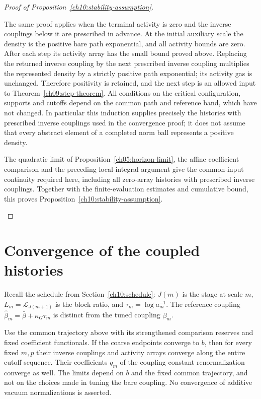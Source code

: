 \begin{proof}[Proof of Proposition~\ref{ch10:stability-assumption}]
\begin{enumerate}[label=\emph{Step \arabic*.},ref=\arabic*,leftmargin=*,align=left]
The same proof applies when the terminal activity is zero and the
inverse couplings below it are prescribed in advance. At the initial auxiliary
scale the density is the positive bare path exponential, and all
activity bounds are zero. After each step its activity array has the
small bound proved above. Replacing the returned inverse coupling by the next
prescribed inverse coupling multiplies the represented density by a strictly
positive path exponential; its activity gas is unchanged. Therefore
positivity is retained, and the next step is an allowed input to
Theorem~\ref{ch09:step-theorem}. All conditions on the critical configuration, supports and cutoffs
depend on the common path and reference band, which have
not changed. In particular this induction supplies precisely the
histories with prescribed inverse couplings used in the convergence proof; it does not assume
that every abstract element of a completed norm ball represents a
positive density.

The quadratic limit of Proposition~\ref{ch05:horizon-limit}, the affine
coefficient comparison and the preceding local-integral argument give
the common-input continuity required here, including all zero-array
histories with prescribed inverse couplings. Together with the finite-evaluation
estimates and cumulative bound, this proves
Proposition~\ref{ch10:stability-assumption}. \qedhere
\end{enumerate}
\end{proof}

\section{Convergence of the coupled histories}
\label{ch10:fixed-scale}

Recall the schedule from Section~\ref{ch10:schedule}: $J(m)$ is the stage at scale $m$, $L_m=\mathscr L_{J(m+1)}$ is the block ratio, and $\tau_m=\log a_m^{-1}$. The reference coupling $\widehat\beta_m=\bar\beta+\kappa_G\tau_m$ is distinct from the tuned coupling $\beta_m$.

\begin{theorem}
\label{ch10:convergence}
Use the common trajectory above with its strengthened comparison
reserves and fixed coefficient functionals. If the coarse endpoints
converge to $b$, then for every fixed
$m,p$ their inverse couplings and activity arrays converge along the entire
cutoff sequence. Their coefficients $q_m$ of the coupling constant renormalization converge as well.
The limits depend on $b$ and the fixed common trajectory, and not
on the choices made in tuning the bare coupling. No convergence of additive vacuum
normalizations is asserted.
\end{theorem}


